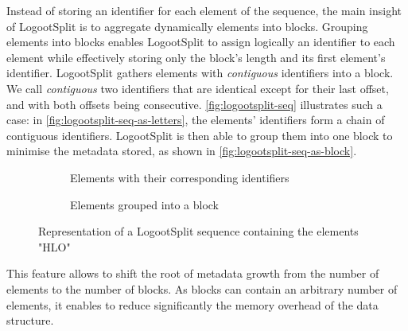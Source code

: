 \documentclass[sigplan,10pt]{acmart}
\newcommand{\trm}[1]{\mathit{#1}}
\newcommand{\id}[3]{$\trm{#1}^{\trm{#2}}_{\trm{#3}}$}
\newcommand{\widthletter}{7mm}
\begin{document}
Instead of storing an identifier for each element of the sequence, the main insight of LogootSplit is to aggregate dynamically elements into blocks.
Grouping elements into blocks enables LogootSplit to assign logically an identifier to each element while effectively storing only the block's length and its first element's identifier.
LogootSplit gathers elements with \emph{contiguous} identifiers into a block.
We call \emph{contiguous} two identifiers that are identical except for their last offset, and with both offsets being consecutive.
\autoref{fig:logootsplit-seq} illustrates such a case: in \autoref{fig:logootsplit-seq-as-letters}, the elements' identifiers form a chain of contiguous identifiers.
LogootSplit is then able to group them into one block to minimise the metadata stored, as shown in \autoref{fig:logootsplit-seq-as-block}.

\begin{figure}[ht!]
    \begin{subfigure}{0.38\columnwidth}
        \centering
        \caption{Elements with their corresponding identifiers}
        \label{fig:logootsplit-seq-as-letters}
    \end{subfigure}
    \hspace{0.03\columnwidth}
    \begin{subfigure}{0.45\columnwidth}
        \centering
        \caption{Elements grouped into a block}
        \label{fig:logootsplit-seq-as-block}
    \end{subfigure}
    \caption{Representation of a LogootSplit sequence containing the elements "HLO"}
    \label{fig:logootsplit-seq}
\end{figure}

This feature allows to shift the root of metadata growth from the number of elements to the number of blocks.
As blocks can contain an arbitrary number of elements, it enables to reduce significantly the memory overhead of the data structure.
\end{document}
